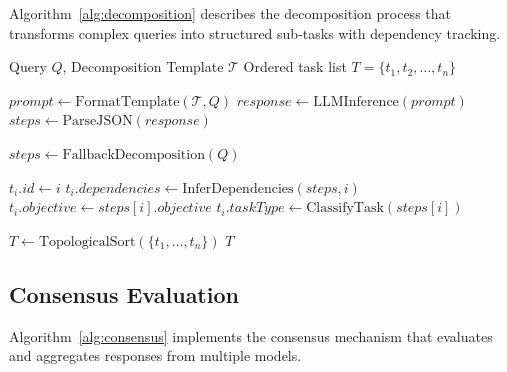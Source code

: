 Algorithm~\ref{alg:decomposition} describes the decomposition process that transforms complex queries into structured sub-tasks with dependency tracking.

\begin{algorithm}[!ht]
\caption{Dynamic Task Decomposition}
\label{alg:decomposition}
\begin{algorithmic}[1]
\Require Query $Q$, Decomposition Template $\mathcal{T}$
\Ensure Ordered task list $T = \{t_1, t_2, \ldots, t_n\}$

\State $prompt \gets \text{FormatTemplate}(\mathcal{T}, Q)$
\State $response \gets \text{LLMInference}(prompt)$
\State $steps \gets \text{ParseJSON}(response)$

    \State $steps \gets \text{FallbackDecomposition}(Q)$ 
\EndIf

    \State $t_i.\textit{id} \gets i$
    \State $t_i.\textit{dependencies} \gets \text{InferDependencies}(steps, i)$
    \State $t_i.\textit{objective} \gets steps[i].\textit{objective}$
    \State $t_i.\textit{taskType} \gets \text{ClassifyTask}(steps[i])$
\EndFor

\State $T \gets \text{TopologicalSort}(\{t_1, \ldots, t_n\})$
\State \Return $T$
\end{algorithmic}
\end{algorithm}

\subsection{Consensus Evaluation}

Algorithm~\ref{alg:consensus} implements the consensus mechanism that evaluates and aggregates responses from multiple models.

